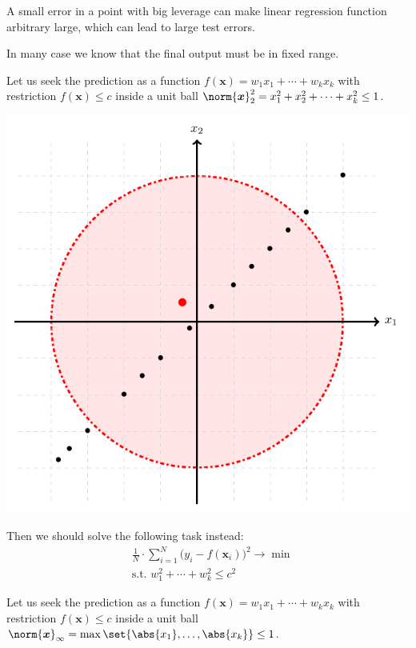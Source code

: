 \documentclass[landscape,footrule]{foils}
\renewcommand{\vec}[1]{\boldsymbol{#1}}
\begin{document}
A small error in a point with big leverage can make linear regression function arbitrary large, which can lead to large test errors.
\begin{triangles}
\item In many case we know that the final output must be in fixed range.
\end{triangles}


Let us seek the prediction as a function $f(\vec{x})=w_1x_1+\cdots+w_kx_k$ with restriction $f(\vec{x})\leq c$ inside a unit ball $\norm{\vec{x}}_2^2=x_1^2+x_2^2+\cdots+x_k^2\leq 1$. 

\centerline{\includegraphics[scale=0.55]{ridge-constraint}}
\vspace*{-2ex}


Then we should solve the following task instead: \vspace*{-1.5ex}
\begin{align*}
&\frac{1}{N}\cdot\sum_{i=1}^N\bigl(y_i-f(\vec{x}_i)\bigr)^2\to \min\\
&\text{s.t. } w_1^2+\cdots+ w_k^2\leq c^2
\end{align*}





\enlargethispage{1cm}
Let us seek the prediction as a function $f(\vec{x})=w_1x_1+\cdots+w_kx_k$ with restriction $f(\vec{x})\leq c$ inside a unit ball $\norm{\vec{x}}_\infty=\max\set{\abs{x_1},\ldots,\abs{x_k}}\leq 1$. 
\end{document}
